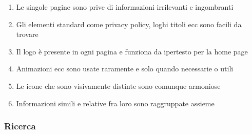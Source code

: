 \documentclass[../Report.tex]{subfiles}
\begin{document}
\begin{enumerate}
        \item Le singole pagine sono prive di informazioni irrilevanti e ingombranti 
        \item Gli elementi standard come privacy policy, loghi titoli ecc sono facili da trovare 
        \item Il logo è presente in ogni pagina e funziona da ipertesto per la home page 
        \item Animazioni ecc sono usate raramente e solo quando necessarie o utili 
        \item Le icone che sono visivamente distinte sono comunque armoniose 
        \item Informazioni simili e relative fra loro sono raggruppate assieme 
    \end{enumerate}

    \subsubsection{Ricerca}
\end{document}
